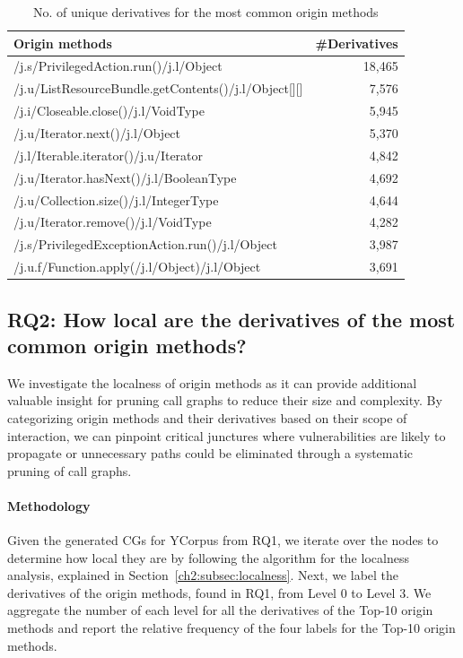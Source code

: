 \begin{table}
\centering
\caption{No. of unique derivatives for the most common origin methods}
\label{ch2:tab:origin_der}
\begin{tabular}{@{}lr@{}}
\toprule
Origin methods & \#Derivatives \\
\midrule
/j.s/PrivilegedAction.run()/j.l/Object & 18,465 \\
/j.u/ListResourceBundle.getContents()/j.l/Object[][] & 7,576 \\
/j.i/Closeable.close()/j.l/VoidType & 5,945 \\
/j.u/Iterator.next()/j.l/Object & 5,370 \\
/j.l/Iterable.iterator()/j.u/Iterator & 4,842 \\
/j.u/Iterator.hasNext()/j.l/BooleanType & 4,692 \\
/j.u/Collection.size()/j.l/IntegerType & 4,644 \\
/j.u/Iterator.remove()/j.l/VoidType & 4,282 \\
/j.s/PrivilegedExceptionAction.run()/j.l/Object & 3,987 \\
/j.u.f/Function.apply(/j.l/Object)/j.l/Object & 3,691 \\
\bottomrule
\end{tabular}
\end{table}

\subsection{\textbf{RQ2}: How local are the derivatives of the most common origin methods?}
We investigate the localness of origin methods as it can provide additional valuable insight for pruning call graphs to reduce their size and complexity. By categorizing origin methods and their derivatives based on their scope of interaction, we can pinpoint critical junctures where vulnerabilities are likely to propagate or unnecessary paths could be eliminated through a systematic pruning of call graphs.

\paragraph{Methodology}
Given the generated CGs for YCorpus from RQ1, we iterate over the nodes to determine how local they are by following the algorithm for the localness analysis, explained in Section~\ref{ch2:subsec:localness}. Next, we label the derivatives of the origin methods, found in RQ1, from Level 0 to Level 3. We aggregate the number of each level for all the derivatives of the Top-10 origin methods and report the relative frequency of the four labels for the Top-10 origin methods.

